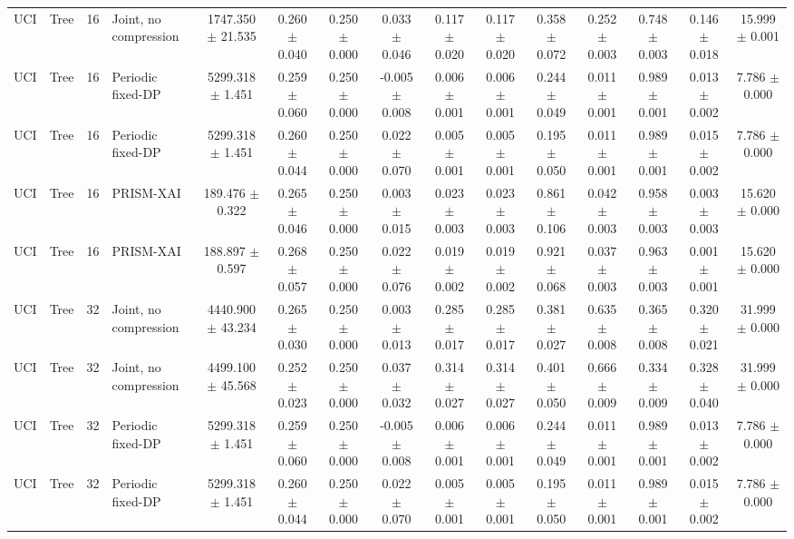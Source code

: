 \begin{table}[t]
\begin{tabular}{llllccccccccccc}
UCI & Tree & 16 & Joint, no compression & 1747.350 $\pm$ 21.535 & 0.260 $\pm$ 0.040 & 0.250 $\pm$ 0.000 & 0.033 $\pm$ 0.046 & 0.117 $\pm$ 0.020 & 0.117 $\pm$ 0.020 & 0.358 $\pm$ 0.072 & 0.252 $\pm$ 0.003 & 0.748 $\pm$ 0.003 & 0.146 $\pm$ 0.018 & 15.999 $\pm$ 0.001 \\
UCI & Tree & 16 & Periodic fixed-DP & 5299.318 $\pm$ 1.451 & 0.259 $\pm$ 0.060 & 0.250 $\pm$ 0.000 & -0.005 $\pm$ 0.008 & 0.006 $\pm$ 0.001 & 0.006 $\pm$ 0.001 & 0.244 $\pm$ 0.049 & 0.011 $\pm$ 0.001 & 0.989 $\pm$ 0.001 & 0.013 $\pm$ 0.002 & 7.786 $\pm$ 0.000 \\
UCI & Tree & 16 & Periodic fixed-DP & 5299.318 $\pm$ 1.451 & 0.260 $\pm$ 0.044 & 0.250 $\pm$ 0.000 & 0.022 $\pm$ 0.070 & 0.005 $\pm$ 0.001 & 0.005 $\pm$ 0.001 & 0.195 $\pm$ 0.050 & 0.011 $\pm$ 0.001 & 0.989 $\pm$ 0.001 & 0.015 $\pm$ 0.002 & 7.786 $\pm$ 0.000 \\
UCI & Tree & 16 & PRISM-XAI & 189.476 $\pm$ 0.322 & 0.265 $\pm$ 0.046 & 0.250 $\pm$ 0.000 & 0.003 $\pm$ 0.015 & 0.023 $\pm$ 0.003 & 0.023 $\pm$ 0.003 & 0.861 $\pm$ 0.106 & 0.042 $\pm$ 0.003 & 0.958 $\pm$ 0.003 & 0.003 $\pm$ 0.003 & 15.620 $\pm$ 0.000 \\
UCI & Tree & 16 & PRISM-XAI & 188.897 $\pm$ 0.597 & 0.268 $\pm$ 0.057 & 0.250 $\pm$ 0.000 & 0.022 $\pm$ 0.076 & 0.019 $\pm$ 0.002 & 0.019 $\pm$ 0.002 & 0.921 $\pm$ 0.068 & 0.037 $\pm$ 0.003 & 0.963 $\pm$ 0.003 & 0.001 $\pm$ 0.001 & 15.620 $\pm$ 0.000 \\
UCI & Tree & 32 & Joint, no compression & 4440.900 $\pm$ 43.234 & 0.265 $\pm$ 0.030 & 0.250 $\pm$ 0.000 & 0.003 $\pm$ 0.013 & 0.285 $\pm$ 0.017 & 0.285 $\pm$ 0.017 & 0.381 $\pm$ 0.027 & 0.635 $\pm$ 0.008 & 0.365 $\pm$ 0.008 & 0.320 $\pm$ 0.021 & 31.999 $\pm$ 0.000 \\
UCI & Tree & 32 & Joint, no compression & 4499.100 $\pm$ 45.568 & 0.252 $\pm$ 0.023 & 0.250 $\pm$ 0.000 & 0.037 $\pm$ 0.032 & 0.314 $\pm$ 0.027 & 0.314 $\pm$ 0.027 & 0.401 $\pm$ 0.050 & 0.666 $\pm$ 0.009 & 0.334 $\pm$ 0.009 & 0.328 $\pm$ 0.040 & 31.999 $\pm$ 0.000 \\
UCI & Tree & 32 & Periodic fixed-DP & 5299.318 $\pm$ 1.451 & 0.259 $\pm$ 0.060 & 0.250 $\pm$ 0.000 & -0.005 $\pm$ 0.008 & 0.006 $\pm$ 0.001 & 0.006 $\pm$ 0.001 & 0.244 $\pm$ 0.049 & 0.011 $\pm$ 0.001 & 0.989 $\pm$ 0.001 & 0.013 $\pm$ 0.002 & 7.786 $\pm$ 0.000 \\
UCI & Tree & 32 & Periodic fixed-DP & 5299.318 $\pm$ 1.451 & 0.260 $\pm$ 0.044 & 0.250 $\pm$ 0.000 & 0.022 $\pm$ 0.070 & 0.005 $\pm$ 0.001 & 0.005 $\pm$ 0.001 & 0.195 $\pm$ 0.050 & 0.011 $\pm$ 0.001 & 0.989 $\pm$ 0.001 & 0.015 $\pm$ 0.002 & 7.786 $\pm$ 0.000 \\

\end{tabular}
\end{table}
